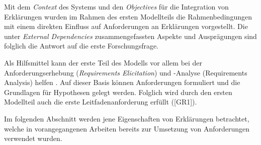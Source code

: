 \smallskip

Mit dem \textit{Context} des Systems und den \textit{Objectives} für die Integration von Erklärungen wurden im Rahmen des ersten Modellteils die Rahmenbedingungen mit einem direkten Einfluss auf Anforderungen an Erklärungen vorgestellt. Die unter \textit{External Dependencies} zusammengefassten Aspekte und Ausprägungen sind folglich die Antwort auf die erste Forschungsfrage.

Als Hilfsmittel kann der erste Teil des Modells vor allem bei der Anforderungserhebung (\textit{Requirements Elicitation}) und -Analyse (Requirements Analysis) helfen \cite{schneider2012abenteuer}. Auf dieser Basis können Anforderungen formuliert und die Grundlagen für Hypothesen gelegt werden. Folglich wird durch den ersten Modellteil auch die erste Leitfadenanforderung erfüllt ([GR1]).

\smallskip

Im folgenden Abschnitt werden jene Eigenschaften von Erklärungen betrachtet, welche in vorangegangenen Arbeiten bereits zur Umsetzung von Anforderungen verwendet wurden.
